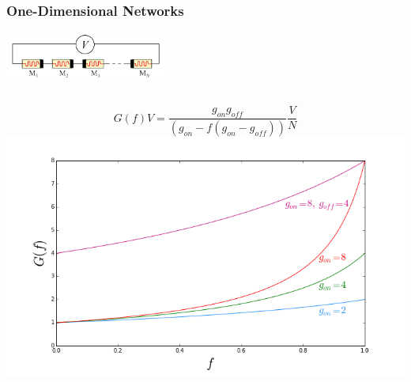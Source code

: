 \documentclass[mathserif]{beamer}
\begin{document}
\begin{frame}
\frametitle{One-Dimensional Networks}
\centering
\includegraphics[width=0.4\textwidth]{1D_memristor_chain.png}

\begin{columns}
$$G(f)V = \frac{g_{on}g_{off}}{(g_{on} - f (g_{on} - g_{off}))}\frac{V}{N}$$
\centering
\includegraphics[width=\textwidth]{1D_Network_Cond.png}


\end{columns}
\end{frame}
\end{document}
